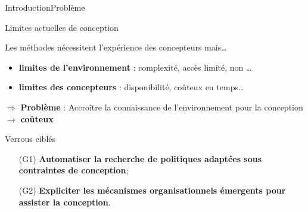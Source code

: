 \begin{frame}{Introduction}{Problème}


    \begin{alertblock}{Limites actuelles de conception}

        Les méthodes nécessitent l'expérience des concepteurs mais\dots
        \begin{itemize}
            \item \textbf{limites de l'environnement} : complexité, accès limité, non \dots
            \item \textbf{limites des concepteurs} : disponibilité, coûteux en temps\dots
        \end{itemize}

        \vspace{-2ex}

        \begin{center}
            \begin{minipage}{13.5cm}
                \begin{block}{}
                    $\Longrightarrow$ \textbf{Problème} : Accroître la connaissance de l'environnement pour la conception $\rightarrow$ \textbf{coûteux}
                \end{block}
            \end{minipage}
        \end{center}

    \end{alertblock}

    \begin{exampleblock}{Verrous ciblés}
        \begin{enumerate}
            \item[\phantom{X} (G1)] \textbf{Automatiser la recherche de politiques adaptées sous contraintes de conception};
            \item[\phantom{X} (G2)] \textbf{Expliciter les mécanismes organisationnels émergents pour assister la conception}.
        \end{enumerate}
        
        \

        \centering
    \end{exampleblock}

\end{frame}

